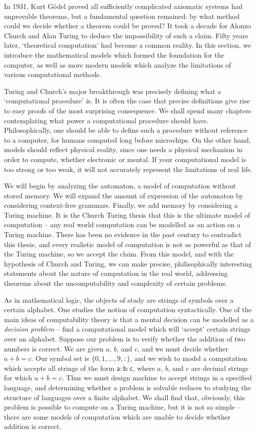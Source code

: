 In 1931, Kurt G\"{o}del proved all sufficiently complicated axiomatic systems had unprovable theorems, but a fundamental question remained: by what method could we decide whether a theorem could be proved? It took a decade for Alonzo Church and Alan Turing to deduce the impossibility of such a claim. Fifty years later, `theoretical computation' had become a common reality. In this section, we introduce the mathematical models which formed the foundation for the computer, as well as more modern models which analyze the limitations of various computational methods.

Turing and Church's major breakthrough was precisely defining what a `computational procedure' is. It is often the case that precise definitions give rise to easy proofs of the most surprising consequence. We shall spend many chapters contemplating what power a computational procedure should have. Philosophically, one should be able to define such a procedure without reference to a computer, for humans computed long before microchips. On the other hand, models should reflect physical reality, since one needs a physical mechanism in order to compute, whether electronic or mental. If your computational model is too strong or too weak, it will not accurately represent the limitations of real life.

We will begin by analyzing the automaton, a model of computation without stored memory. We will expand the amount of expression of the automaton by considering context-free grammars. Finally, we add memory by considering a Turing machine. It is the Church Turing thesis that this is the ultimate model of computation -- any real world computation can be modelled as an action on a Turing machine. There has been no evidence in the past century to contradict this thesis, and every realistic model of computation is not as powerful as that of the Turing machine, so we accept the claim. From this model, and with the hypothesis of Church and Turing, we can make precise, philisophically interesting statements about the nature of computation in the real world, addressing theorems about the uncomputability and complexity of certain problems.

As in mathematical logic, the objects of study are strings of symbols over a certain alphabet. One studies the notion of computation syntactically. One of the main ideas of computability theory is that a mental decision can be modelled as a \emph{decision problem} -- find a computational model which will `accept' certain strings over an alphabet. Suppose our problem is to verify whether the addition of two numbers is correct. We are given $a$, $b$, and $c$, and we must decide whether $a + b = c$. Our symbol set is $\{ 0, 1, \dots, 9, : \}$, and we wish to model a computation which accepts all strings of the form $\mathsf{a:b:c}$, where $a$, $b$, and $c$ are decimal strings for which $a + b = c$. Thus we must design machine to accept strings in a specified language, and determining whether a problem is solvable reduces to studying the structure of languages over a finite alphabet. We shall find that, obviously, this problem is possible to compute on a Turing machine, but it is not so simple -- there are some models of computation which are unable to decide whether addition is correct.

